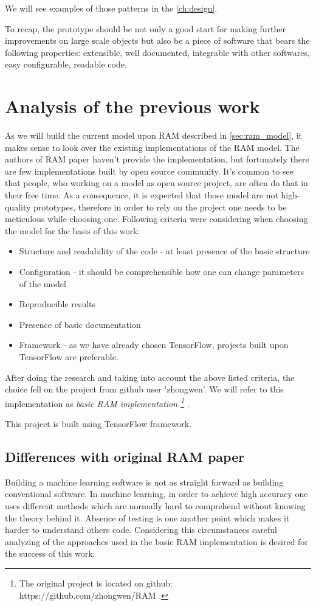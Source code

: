 {We will see examples of those patterns in the \autoref{ch:design}.

To recap, the prototype should be not only a good start for making further
improvements on large scale objects but also be a piece of software that bears the
following properties: extensible, well documented, integrable with other
softwares, easy configurable, readable code.


\section{Analysis of the previous work}
As we will build the current model upon RAM described
in \autoref{sec:ram_model}, it makes sense to look over the existing implementations
of the RAM model.
The authors of RAM paper haven't provide the implementation, but
fortunately there are few implementations built by open source community.
It's common to see that people, who working on a model as open source project,
are often do that in their free time. As a consequence, it is expected that those model
are not high-quality prototypes, therefore in order to rely on the project
one needs to be meticulous while choosing one.
Following criteria were considering when choosing the model for the basis
of this work:

\begin{itemize}
	\item Structure and readability of the code - at least presence of the basic structure
	\item Configuration - it should be comprehensible how one can change parameters
		of the model
	\item Reproducible results
	\item Presence of basic documentation
	\item Framework - as we have already chosen TensorFlow, projects built upon
		TensorFlow are preferable.
\end{itemize}

After doing the research and taking into account the above listed criteria,
the choice fell on the project from github user 'zhongwen'. We will refer to
this implementation as \emph{
	basic RAM implementation
	\footnote{The original project is located on github: https://github.com/zhongwen/RAM .}
}.

This project is built using TensorFlow framework.

\subsection{Differences with original RAM paper}
Building a machine learning software is not as straight forward as building
conventional software. In machine learning, in order to achieve high accuracy
one uses different methods which are normally hard to comprehend without knowing
the theory behind it. Absence of testing is one another point which makes it
harder to understand others code. Considering this circumstances careful
analyzing of the approaches used in the basic RAM implementation
is desired for the success of this work.

}
